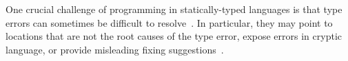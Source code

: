 One crucial challenge of programming in statically-typed languages is that type errors can sometimes be difficult to resolve~\cite{Tirronen2015-nr, Hage2020-hg}. In particular, they may point to locations that are not the root  causes of the type error, expose errors in cryptic language, or provide misleading fixing suggestions~\cite{Wu2017-eb}.


